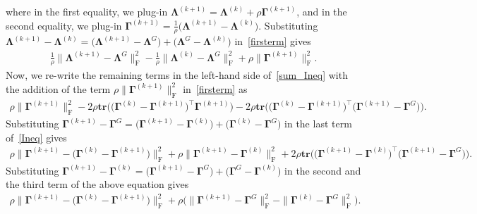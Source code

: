 \documentclass[12pt]{article}
\begin{document}
where in the first equality, we plug-in $\boldsymbol{\Lambda}^{(k+1)}=\boldsymbol{\Lambda}^{(k)}+\rho \boldsymbol{\Gamma}^{(k+1)}$, and in the second equality, we plug-in $\boldsymbol{\Gamma}^{(k+1)}=\frac{1}{\rho}\big( \boldsymbol{\Lambda}^{(k+1)} - \boldsymbol{\Lambda}^{(k)} \big)$.
Substituting $\boldsymbol{\Lambda}^{(k+1)} - \boldsymbol{\Lambda}^{(k)} = \big( \boldsymbol{\Lambda}^{(k+1)} - \boldsymbol{\Lambda}^{G} \big) + \big( \boldsymbol{\Lambda}^{G} - \boldsymbol{\Lambda}^{(k)} \big)$ in~\eqref{firsterm} gives
\begin{align*}
    \frac{1}{\rho} \| \boldsymbol{\Lambda}^{(k+1)} - \boldsymbol{\Lambda}^{G} \|_{\text{F}}^{2} - \frac{1}{\rho} \| \boldsymbol{\Lambda}^{(k)} - \boldsymbol{\Lambda}^{G} \|_{\text{F}}^{2} + \rho \| \boldsymbol{\Gamma}^{(k+1)} \|_{\text{F}}^{2} .
\end{align*}
Now, we re-write the remaining terms in the left-hand side of~\eqref{sum_Ineq} with the addition of the term $\rho \| \boldsymbol{\Gamma}^{(k+1)} \|_{\text{F}}^{2}$ in~\eqref{firsterm} as
\begin{align} \label{Ineq}
    \rho \| \boldsymbol{\Gamma}^{(k+1)} \|_{\text{F}}^{2} -2 \rho \textbf{tr}\big( \big( \boldsymbol{\Gamma}^{(k)} - \boldsymbol{\Gamma}^{(k+1)} \big)^{\top}\boldsymbol{\Gamma}^{(k+1)} \big) 
    -2\rho \textbf{tr}\big( \big( \boldsymbol{\Gamma}^{(k)} - \boldsymbol{\Gamma}^{(k+1)} \big)^{\top}\big(\boldsymbol{\Gamma}^{(k+1)}-\boldsymbol{\Gamma}^{G}\big) \big).
\end{align}
Substituting $\boldsymbol{\Gamma}^{(k+1)} - \boldsymbol{\Gamma}^{G} = \big( \boldsymbol{\Gamma}^{(k+1)} - \boldsymbol{\Gamma}^{(k)} \big) + \big( \boldsymbol{\Gamma}^{(k)} - \boldsymbol{\Gamma}^{G} \big)$ in the last term of~\eqref{Ineq} gives 
\begin{align*} 
    \rho \| \boldsymbol{\Gamma}^{(k+1)} - \big( \boldsymbol{\Gamma}^{(k)} - \boldsymbol{\Gamma}^{(k+1)} \big) \|_{\text{F}}^{2} 
    + \rho \| \boldsymbol{\Gamma}^{(k+1)} - \boldsymbol{\Gamma}^{(k)} \|_{\text{F}}^{2} + 2 \rho \textbf{tr}\big( \big( \boldsymbol{\Gamma}^{(k+1)} - \boldsymbol{\Gamma}^{(k)} \big)^{\top}\big(\boldsymbol{\Gamma}^{(k+1)}-\boldsymbol{\Gamma}^{G}\big) \big).
\end{align*}
Substituting $\boldsymbol{\Gamma}^{(k+1)} - \boldsymbol{\Gamma}^{(k)} = \big( \boldsymbol{\Gamma}^{(k+1)} - \boldsymbol{\Gamma}^{G} \big) + \big( \boldsymbol{\Gamma}^{G} - \boldsymbol{\Gamma}^{(k)} \big)$ in the second and the third term of the above equation gives 
\begin{align*}
    \rho \| \boldsymbol{\Gamma}^{(k+1)} - \big( \boldsymbol{\Gamma}^{(k)} - \boldsymbol{\Gamma}^{(k+1)} \big) \|_{\text{F}}^{2} 
    + \rho \bigg( \| \boldsymbol{\Gamma}^{(k+1)} - \boldsymbol{\Gamma}^{G} \|_{\text{F}}^{2} 
    - \| \boldsymbol{\Gamma}^{(k)} - \boldsymbol{\Gamma}^{G} \|_{\text{F}}^{2} \bigg).
\end{align*}
\end{document}
